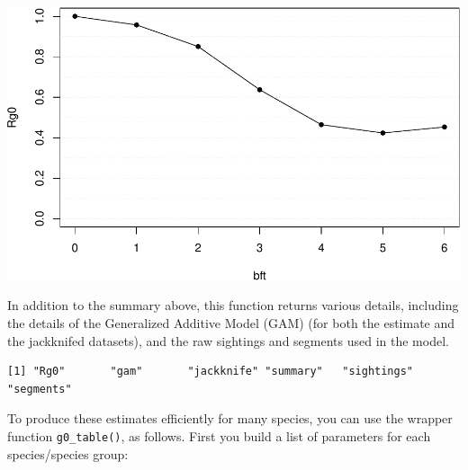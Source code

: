 \documentclass[
]{book}
\begin{document}
\includegraphics{figures/unnamed-chunk-205-1.pdf}

In addition to the summary above, this function returns various details, including the details of the Generalized Additive Model (GAM) (for both the estimate and the jackknifed datasets), and the raw sightings and segments used in the model.

\begin{verbatim}
[1] "Rg0"       "gam"       "jackknife" "summary"   "sightings" "segments" 
\end{verbatim}

To produce these estimates efficiently for many species, you can use the wrapper function \texttt{g0\_table()}, as follows. First you build a list of parameters for each species/species group:
\end{document}
